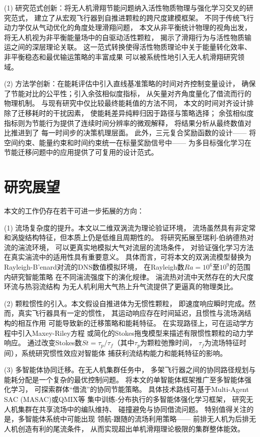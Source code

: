(1) 研究范式创新：将无人机滑翔节能问题纳入活性物质物理与强化学习交叉的研究范式，
建立了从宏观飞行器到自推进颗粒的跨尺度建模框架。
不同于传统飞行动力学仅从气动优化的角度处理滑翔问题，
本文从非平衡统计物理的视角出发，
将无人机视为非平衡能量场中的自驱动活性颗粒，
揭示了滑翔行为与活性物质输运之间的深层理论关联。
这一范式转换使得活性物质理论中关于能量转化效率、
非平衡稳态和最优输运策略的丰富成果
可以被系统性地引入无人机滑翔研究领域。

(2) 方法学创新：在能耗评估中引入直线基准策略的时间对齐控制变量设计，
确保了节能对比的公平性；引入余弦相似度指标，
从矢量对齐角度量化了借流而行的物理机制。
与现有研究中仅比较最终能耗值的方法不同，
本文的时间对齐设计排除了迁移耗时的干扰因素，
使能耗差异纯粹归因于路径与策略选择；
余弦相似度指标则为节能行为提供了连续时间分辨率的微观解释，
将结果分析从最终数值对比推进到了
每一时间步的决策机理层面。
此外，三元复合奖励函数的设计——
将空间约束、能量约束和时间约束统一在标量奖励信号中——
为多目标强化学习在节能迁移问题中的应用提供了可复用的设计范式。

\section{研究展望}

本文的工作仍存在若干可进一步拓展的方向：

(1) 流场复杂度的提升。本文以二维双涡流为理论验证环境，
流场虽然具有非定常和涡旋结构特征，但本质上仍是低维且周期性的。
将研究拓展至瑞利-伯纳德热对流的湍流环境，
可以更真实地模拟大气对流层的流场条件，
对验证强化学习方法在真实湍流中的适用性具有重要意义。
具体而言，可将本文的双涡流模型替换为Rayleigh-B'{e}nard对流的DNS数值模拟环境，
在Rayleigh数$Ra = 10^6$至$10^9$的范围内研究智能策略
在不同湍流强度下的演化规律。
湍流热对流中天然存在的大尺度环流与热羽流结构
为无人机利用大气热上升气流提供了更逼真的物理类比。

(2) 颗粒惯性的引入。本文假设自推进体为无惯性颗粒，
即速度响应瞬时完成。然而，真实飞行器具有一定的惯性，
其运动响应存在时间延迟，且惯性与流场涡结构的相互作用
可能导致新的迁移策略和能耗特征。
在实现路径上，可在运动学方程中引入Maxey-Riley方程
或简化的Stokes拖曳模型来描述有限惯性颗粒的动力学响应。
通过改变Stokes数$St = \tau_p / \tau_f$（其中$\tau_p$为颗粒弛豫时间，
$\tau_f$为流场特征时间），系统研究惯性效应对智能体
捕获利流结构能力和能耗特征的影响。

(3) 多智能体协同迁移。在无人机集群任务中，
多架飞行器之间的协同路径规划与能耗分配是一个复杂的最优控制问题。
将本文的单智能体框架推广至多智能体强化学习，
可探索群体“借流”的协同节能策略。
具体技术路线可基于Multi-Agent SAC (MASAC)或QMIX等
集中训练-分布执行的多智能体强化学习框架，
研究无人机集群在共享流场中的编队维持、
碰撞避免与协同借流问题。
特别值得关注的是，多智能体系统中可能出现
领航-跟随的流场利用策略——
前排无人机为后排无人机创造有利的尾流条件，
从而实现超出单机滑翔理论极限的集群整体能效。

